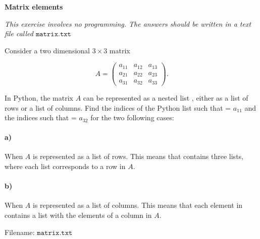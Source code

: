 \begin{Problem}{\textbf{Matrix elements}}

\begin{center}
\emph{This exercise involves no programming. \newline The answers should be written in a text file called $\texttt{matrix.txt}$}
\end{center}

\noindent Consider a two dimensional $3 \times 3$ matrix

\begin{equation*}
   A = \begin{pmatrix}
        a_{1 1} & a_{1 2} & a_{1 3} \\
        a_{2 1} & a_{2 2} & a_{2 3} \\
        a_{3 1} & a_{3 2} & a_{3 3}
    \end{pmatrix} .
\end{equation*}

In Python, the matrix $A$ can be represented as a nested list , either as a list of rows or a list of columns. Find the indices  of the Python list  such that  = $a_{1 1}$ and the indices   such that  = $a_{3 2}$ for the two following cases:

\paragraph{a)}
When $A$ is represented as a list of rows. This means that  contains three lists, where each list corresponds to a row in $A$.

\paragraph{b)}
When $A$ is represented as a list of columns. This means that each element in  contains a list with the elements of a column in $A$.


Filename: $\texttt{matrix.txt}$
\end{Problem}
